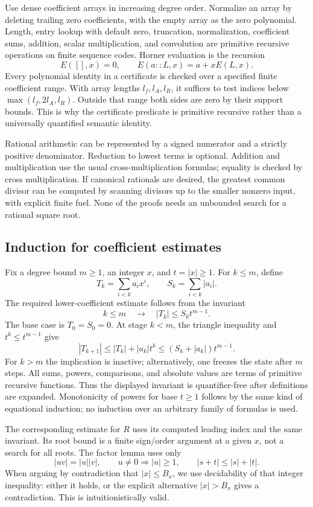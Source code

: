 Use dense coefficient arrays in increasing degree order. Normalize an
array by deleting trailing zero coefficients, with the empty array as
the zero polynomial. Length, entry lookup with default zero, truncation,
normalization, coefficient sums, addition, scalar multiplication, and
convolution are primitive recursive operations on finite sequence codes.
Horner evaluation is the recursion
\[
 E([],x)=0,\qquad E(a::L,x)=a+xE(L,x).
\]
Every polynomial identity in a certificate is checked over a specified
finite coefficient range. With array lengths $l_f,l_A,l_R$, it suffices
to test indices below $\max(l_f,2l_A,l_R)$. Outside that range both
sides are zero by their support bounds. This is why the certificate
predicate is primitive recursive rather than a universally quantified
semantic identity.

Rational arithmetic can be represented by a signed numerator and a
strictly positive denominator. Reduction to lowest terms is optional.
Addition and multiplication use the usual cross-multiplication formulas;
equality is checked by cross multiplication. If canonical rationals are
desired, the greatest common divisor can be computed by scanning divisors
up to the smaller nonzero input, with explicit finite fuel. None of the
proofs needs an unbounded search for a rational square root.

\subsection{Induction for coefficient estimates}

Fix a degree bound $m\ge1$, an integer $x$, and $t=|x|\ge1$.
For $k\le m$, define
\[
 T_k=\sum_{i<k}a_ix^i,\qquad S_k=\sum_{i<k}|a_i|.
\]
The required lower-coefficient estimate follows from the invariant
\[
 k\le m\quad\longrightarrow\quad |T_k|\le S_k t^{m-1}.
\]
The base case is $T_0=S_0=0$. At stage $k<m$, the triangle inequality
and $t^k\le t^{m-1}$ give
\[
 |T_{k+1}|\le |T_k|+|a_k|t^k
             \le(S_k+|a_k|)t^{m-1}.
\]
For $k>m$ the implication is inactive; alternatively, one freezes
the state after $m$ steps. All sums, powers, comparisons, and
absolute values are terms of primitive recursive functions. Thus the
displayed invariant is quantifier-free after definitions are expanded.
Monotonicity of powers for base $t\ge1$ follows by the same kind of
equational induction; no induction over an arbitrary family of formulas
is used.

The corresponding estimate for $R$ uses its computed leading index and
the same invariant. Its root bound is a finite sign/order argument at a
given $x$, not a search for all roots. The factor lemma uses only
\[
 |uv|=|u||v|,\qquad u\ne0\Rightarrow |u|\ge1,
 \qquad |s+t|\le|s|+|t|.
\]
When arguing by contradiction that $|x|\le B_x$, we use decidability
of that integer inequality: either it holds, or the explicit alternative
$|x|>B_x$ gives a contradiction. This is intuitionistically valid.

